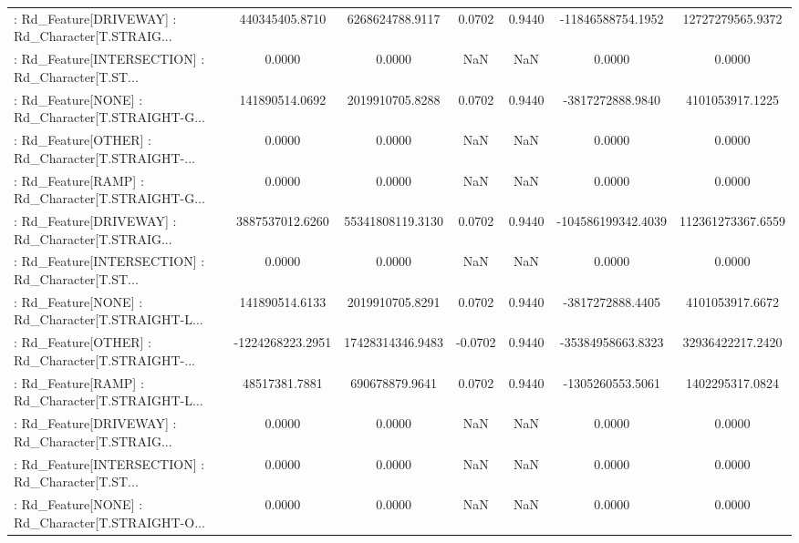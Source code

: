 \begin{longtable}{p{4cm}cccccc}
 : Rd\_Feature[DRIVEWAY] : Rd\_Character[T.STRAIG... &    440345405.8710 &   6268624788.9117 &  0.0702 &       0.9440 &  -11846588754.1952 &  12727279565.9372 \\
 : Rd\_Feature[INTERSECTION] : Rd\_Character[T.ST... &            0.0000 &            0.0000 &     NaN &          NaN &             0.0000 &            0.0000 \\
 : Rd\_Feature[NONE] : Rd\_Character[T.STRAIGHT-G... &    141890514.0692 &   2019910705.8288 &  0.0702 &       0.9440 &   -3817272888.9840 &   4101053917.1225 \\
 : Rd\_Feature[OTHER] : Rd\_Character[T.STRAIGHT-... &            0.0000 &            0.0000 &     NaN &          NaN &             0.0000 &            0.0000 \\
 : Rd\_Feature[RAMP] : Rd\_Character[T.STRAIGHT-G... &            0.0000 &            0.0000 &     NaN &          NaN &             0.0000 &            0.0000 \\
 : Rd\_Feature[DRIVEWAY] : Rd\_Character[T.STRAIG... &   3887537012.6260 &  55341808119.3130 &  0.0702 &       0.9440 & -104586199342.4039 & 112361273367.6559 \\
 : Rd\_Feature[INTERSECTION] : Rd\_Character[T.ST... &            0.0000 &            0.0000 &     NaN &          NaN &             0.0000 &            0.0000 \\
 : Rd\_Feature[NONE] : Rd\_Character[T.STRAIGHT-L... &    141890514.6133 &   2019910705.8291 &  0.0702 &       0.9440 &   -3817272888.4405 &   4101053917.6672 \\
 : Rd\_Feature[OTHER] : Rd\_Character[T.STRAIGHT-... &  -1224268223.2951 &  17428314346.9483 & -0.0702 &       0.9440 &  -35384958663.8323 &  32936422217.2420 \\
 : Rd\_Feature[RAMP] : Rd\_Character[T.STRAIGHT-L... &     48517381.7881 &    690678879.9641 &  0.0702 &       0.9440 &   -1305260553.5061 &   1402295317.0824 \\
 : Rd\_Feature[DRIVEWAY] : Rd\_Character[T.STRAIG... &            0.0000 &            0.0000 &     NaN &          NaN &             0.0000 &            0.0000 \\
 : Rd\_Feature[INTERSECTION] : Rd\_Character[T.ST... &            0.0000 &            0.0000 &     NaN &          NaN &             0.0000 &            0.0000 \\
 : Rd\_Feature[NONE] : Rd\_Character[T.STRAIGHT-O... &            0.0000 &            0.0000 &     NaN &          NaN &             0.0000 &            0.0000 \\

\end{longtable}
